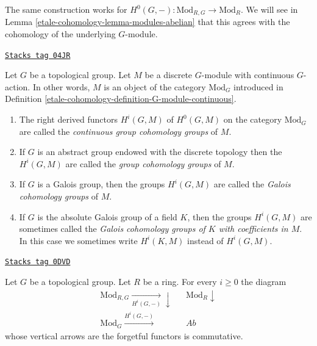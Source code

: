 \medskip\noindent
The same construction works for
$H^0(G, -) : \text{Mod}_{R, G} \to \text{Mod}_R$. We will see in
Lemma \ref{etale-cohomology-lemma-modules-abelian} that this agrees with the cohomology
of the underlying $G$-module.

\begin{definition}
\label{etale-cohomology-definition-galois-cohomology}
\href{https://stacks.math.columbia.edu/tag/04JR}{\texttt{Stacks tag 04JR}}

Let $G$ be a topological group. Let $M$ be a discrete $G$-module
with continuous $G$-action. In other words, $M$ is an object
of the category $\text{Mod}_G$ introduced in
Definition \ref{etale-cohomology-definition-G-module-continuous}.
\begin{enumerate}
\item The right derived functors $H^i(G, M)$ of $H^0(G, M)$ on the
category $\text{Mod}_G$ are called the
{\it continuous group cohomology groups} of $M$.
\item If $G$ is an abstract group endowed with the discrete topology
then the $H^i(G, M)$ are called the {\it group cohomology groups} of $M$.
\item If $G$ is a Galois group, then the groups $H^i(G, M)$ are called
the {\it Galois cohomology groups} of $M$.
\item If $G$ is the absolute Galois group of a field $K$, then the groups
$H^i(G, M)$ are sometimes called the {\it Galois cohomology groups of $K$
with coefficients in $M$}. In this case we sometimes write
$H^i(K, M)$ instead of $H^i(G, M)$.
\end{enumerate}
\end{definition}

\begin{lemma}
\label{etale-cohomology-lemma-modules-abelian}
\href{https://stacks.math.columbia.edu/tag/0DVD}{\texttt{Stacks tag 0DVD}}

Let $G$ be a topological group. Let $R$ be a ring.
For every $i \geq 0$ the diagram
$$
\begin{array}{ccc}\text{Mod}_{R, G} \underset{H^i(G, -)}{\longrightarrow}\downarrow &  & \text{Mod}_R \downarrow \\ \text{Mod}_G \overset{H^i(G, -)}{\longrightarrow} &  & \textit{Ab}\end{array}
$$
whose vertical arrows are the forgetful functors is commutative.
\end{lemma}

